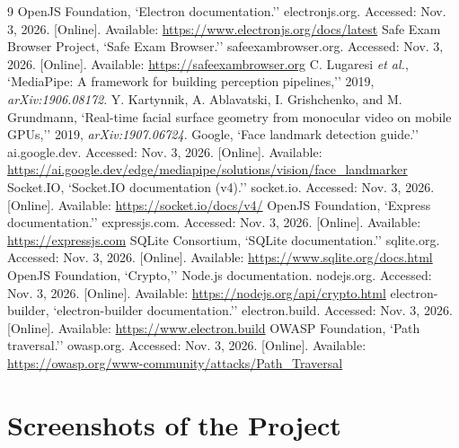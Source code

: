 \documentclass[12pt,a4paper]{report}
\begin{document}
\clearpage
\renewcommand{\bibname}{References}
\begin{thebibliography}{9}
\singlespacing
{} OpenJS Foundation, `Electron documentation.'' electronjs.org. Accessed: Nov. 3, 2026. [Online]. Available: \url{https://www.electronjs.org/docs/latest}
 Safe Exam Browser Project, `Safe Exam Browser.'' safeexambrowser.org. Accessed: Nov. 3, 2026. [Online]. Available: \url{https://safeexambrowser.org}
 C. Lugaresi \textit{et al.}, `MediaPipe: A framework for building perception pipelines,'' 2019, \textit{arXiv:1906.08172}.
 Y. Kartynnik, A. Ablavatski, I. Grishchenko, and M. Grundmann, `Real-time facial surface geometry from monocular video on mobile GPUs,'' 2019, \textit{arXiv:1907.06724}.
 Google, `Face landmark detection guide.'' ai.google.dev. Accessed: Nov. 3, 2026. [Online]. Available: \url{https://ai.google.dev/edge/mediapipe/solutions/vision/face_landmarker}
 Socket.IO, `Socket.IO documentation (v4).'' socket.io. Accessed: Nov. 3, 2026. [Online]. Available: \url{https://socket.io/docs/v4/}
 OpenJS Foundation, `Express documentation.'' expressjs.com. Accessed: Nov. 3, 2026. [Online]. Available: \url{https://expressjs.com}
 SQLite Consortium, `SQLite documentation.'' sqlite.org. Accessed: Nov. 3, 2026. [Online]. Available: \url{https://www.sqlite.org/docs.html}
 OpenJS Foundation, `Crypto,'' Node.js documentation. nodejs.org. Accessed: Nov. 3, 2026. [Online]. Available: \url{https://nodejs.org/api/crypto.html}
 electron-builder, `electron-builder documentation.'' electron.build. Accessed: Nov. 3, 2026. [Online]. Available: \url{https://www.electron.build}
 OWASP Foundation, `Path traversal.'' owasp.org. Accessed: Nov. 3, 2026. [Online]. Available: \url{https://owasp.org/www-community/attacks/Path_Traversal}
\end{thebibliography}

\appendix
\chapter{Screenshots of the Project}
\end{document}
